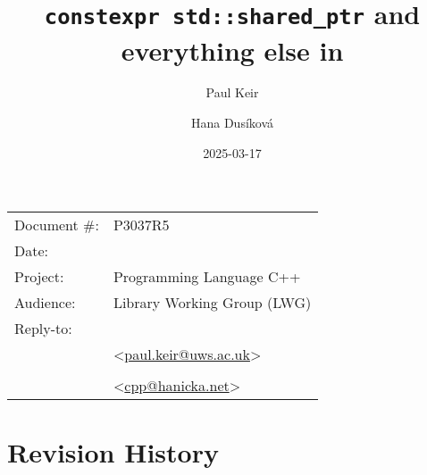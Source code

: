 \documentclass[10pt]{article}
\date{}
\title{\texttt{constexpr std::shared\_ptr} and everything else in \wgxxi{smartptr}}
\makeatletter
\newcommand{\emailaddressP}{paul.keir@uws.ac.uk}
\newcommand{\emailaddressH}{cpp@hanicka.net}
\newcommand{\emailP}{\href{mailto:\emailaddressP}{\emailaddressP}}
\newcommand{\emailH}{\href{mailto:\emailaddressH}{\emailaddressH}}
\makeatother
\begin{document}

\maketitle\vspace{-2cm}

\begin{flushright}
  \begin{tabular}{ll}
  Document \#:&P3037R5\\
  Date:       &\date{2025-03-17}\\
  Project:    &Programming Language C++\\
  Audience:   &Library Working Group (LWG)\\
  Reply-to:   &\author{Paul Keir}\\
              &\textless\emailP\textgreater\\
              &\author{Hana Dusíková}\\
              &\textless\emailH\textgreater
  \end{tabular}
\end{flushright}

{\hypersetup{linkcolor=black}
  \tableofcontents
}

\pagebreak

\section{Revision History}
\end{document}
